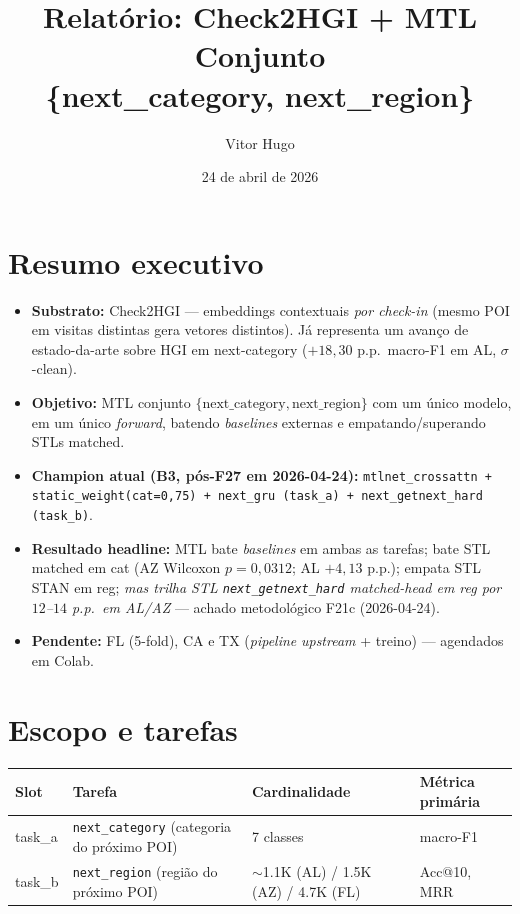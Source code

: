 \documentclass[11pt,a4paper]{article}
\title{\textbf{Relatório: Check2HGI + MTL Conjunto\\ \{next\_category, next\_region\}}}
\author{Vitor Hugo}
\date{24 de abril de 2026}
\begin{document}
\maketitle

\section{Resumo executivo}

\begin{itemize}[leftmargin=*,noitemsep]
\item \textbf{Substrato:} Check2HGI --- embeddings contextuais \emph{por check-in} (mesmo POI em visitas distintas gera vetores distintos). Já representa um avanço de estado-da-arte sobre HGI em next-category ($+18{,}30$ p.p.\ macro-F1 em AL, $\sigma$-clean).
\item \textbf{Objetivo:} MTL conjunto $\{\text{next\_category}, \text{next\_region}\}$ com um único modelo, em um único \textit{forward}, batendo \textit{baselines} externas e empatando/superando STLs matched.
\item \textbf{Champion atual (B3, pós-F27 em 2026-04-24):} \texttt{mtlnet\_crossattn + static\_weight(cat=0{,}75) + next\_gru (task\_a) + next\_getnext\_hard (task\_b)}.
\item \textbf{Resultado headline:} MTL bate \textit{baselines} em ambas as tarefas; bate STL matched em cat (AZ Wilcoxon $p=0{,}0312$; AL $+4{,}13$ p.p.); empata STL STAN em reg; \emph{mas trilha STL \texttt{next\_getnext\_hard} matched-head em reg por $12$--$14$ p.p.\ em AL/AZ} --- achado metodológico F21c (2026-04-24).
\item \textbf{Pendente:} FL (5-fold), CA e TX (\textit{pipeline} \textit{upstream} + treino) --- agendados em Colab.
\end{itemize}

\section{Escopo e tarefas}

\begin{table}[H]
\centering
\small
\begin{tabular}{llll}
\toprule
\textbf{Slot} & \textbf{Tarefa} & \textbf{Cardinalidade} & \textbf{Métrica primária} \\
\midrule
task\_a & \texttt{next\_category} (categoria do próximo POI) & 7 classes & macro-F1 \\
task\_b & \texttt{next\_region} (região do próximo POI) & $\sim$1.1K (AL) / 1.5K (AZ) / 4.7K (FL) & Acc@10, MRR \\
\bottomrule
\end{tabular}
\end{table}
\end{document}
